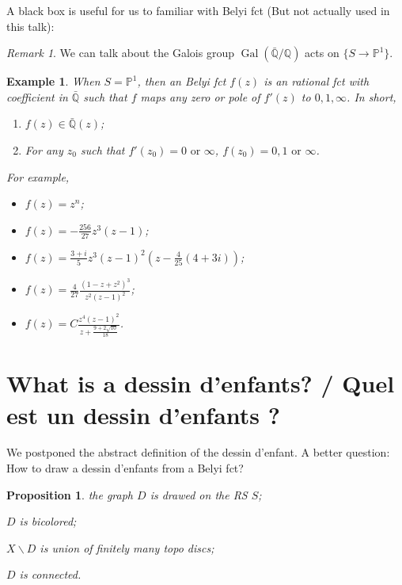 \documentclass[reqno,11pt]{amsart}
\numberwithin{equation}{section}
\theoremstyle{plain}
\newtheorem{proposition}[theorem]{Proposition}
\newtheorem{eg}[theorem]{Example}
\theoremstyle{plain}
\numberwithin{equation}{section}
\theoremstyle{remark}
\newtheorem{remark}[theorem]{Remark}
\DeclareMathOperator{\Gal}{\operatorname{Gal}}
\begin{document}
A black box is useful for us to familiar with Belyi fct (But not actually used in this talk):
\begin{center}
\end{center}
\begin{remark}
	We can talk about the Galois group $\Gal(\bar{\mathbb{Q}} / \mathbb{Q})$ acts on $\{S \longrightarrow \mathbb{P}^1 \}$.
\end{remark}
\begin{eg}
	When $S=\mathbb{P}^1$, then an Belyi fct $f(z)$ is an rational fct with coefficient in $\bar{\mathbb{Q}}$ such that $f$ maps any zero or pole of $f'(z)$ to $0,1,\infty$. In short,
	
	\begin{enumerate}[1.]
		\item  $f(z) \in \bar{\mathbb{Q}}(z)$;
		\item For any $z_0$ such that $f'(z_0)=0 \text{ or } \infty$, $f(z_0)=0,1 \text{ or } \infty$.
	\end{enumerate}

For example,
\begin{itemize}
	\item $f(z)=z^n$;
	\item $\displaystyle f(z)=-\frac{256}{27}z^3(z-1)$;
	\item $\displaystyle f(z)=\frac{3+i}{5}z^3(z-1)^2 \left(z-\frac{4}{25}(4+3i) \right)$;
	\item $\displaystyle f(z)=\frac{4}{27} \frac{(1-z+z^2)^3}{z^2(z-1)^2}$;
	\item $\displaystyle f(z)=C\frac{z^4 (z-1)^2}{z+\frac{9+2\sqrt{10}}{18}}$.
\end{itemize}
\end{eg}
\section{What is a dessin d'enfants? / Quel est un dessin d'enfants ?}

We postponed the abstract definition of the dessin d'enfant. A better question: How to draw a dessin d'enfants from a Belyi fct?

\begin{proposition}
	\item the graph $D$ is drawed on the RS $S$;
	\item $D$ is bicolored;
	\item $X \smallsetminus D$ is union of finitely many topo discs;
	\item $D$ is connected.
\end{proposition}
\end{document}
